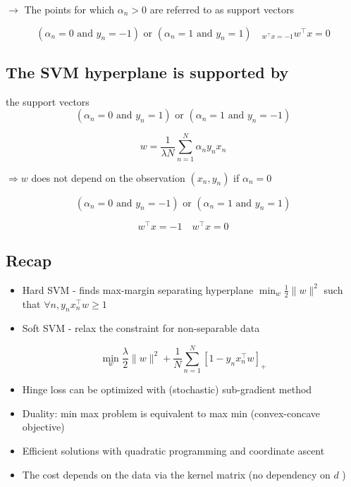 $\rightarrow$ The points for which $\alpha_{n}>0$ are referred to as support vectors

$$
\left(\alpha_{n}=0 \text { and } y_{n}=-1\right) \text { or }\left(\alpha_{n}=1 \text { and } y_{n}=1\right) \quad{ }_{w^{\top} x=-1} w^{\top} x=0
$$

\subsection*{The SVM hyperplane is supported by}
 the support vectors$$
\left(\alpha_{n}=0 \text { and } y_{n}=1\right) \text { or }\left(\alpha_{n}=1 \text { and } y_{n}=-1\right)
$$

$$
w=\frac{1}{\lambda N} \sum_{n=1}^{N} \alpha_{n} y_{n} x_{n}
$$

$\Rightarrow w$ does not depend on the observation $\left(x_{n}, y_{n}\right)$ if $\alpha_{n}=0$

$$
\left(\alpha_{n}=0 \text { and } y_{n}=-1\right) \text { or }\left(\alpha_{n}=1 \text { and } y_{n}=1\right)
$$

$$
w^{\top} x=-1 \quad w^{\top} x=0
$$

\subsection*{Recap}
\begin{itemize}
  \item Hard SVM - finds max-margin separating hyperplane $\min _{w} \frac{1}{2}\|w\|^{2}$ such that $\forall n, y_{n} x_{n}^{\top} w \geq 1$

  \item Soft SVM - relax the constraint for non-separable data

\end{itemize}

$$
\min _{w} \frac{\lambda}{2}\|w\|^{2}+\frac{1}{N} \sum_{n=1}^{N}\left[1-y_{n} x_{n}^{\top} w\right]_{+}
$$

\begin{itemize}
  \item Hinge loss can be optimized with (stochastic) sub-gradient method

  \item Duality: min max problem is equivalent to max min (convex-concave objective)

  \item Efficient solutions with quadratic programming and coordinate ascent

  \item The cost depends on the data via the kernel matrix (no dependency on $d$ )

\end{itemize}